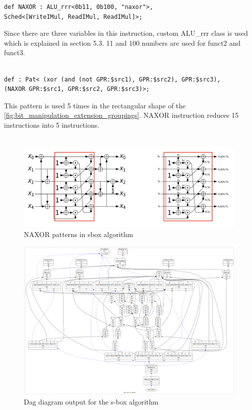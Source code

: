 \begin{lstlisting}
def NAXOR : ALU_rrr<0b11, 0b100, "naxor">,
Sched<[WriteIMul, ReadIMul, ReadIMul]>;
\end{lstlisting}

Since there are three variables in this instruction, custom ALU\_rrr class is used which is explained in section 5.3. 11 and 100 numbers are used for funct2 and funct3.
\\\\
\begin{lstlisting}
def : Pat< (xor (and (not GPR:$src1), GPR:$src2), GPR:$src3),
(NAXOR GPR:$src1, GPR:$src2, GPR:$src3)>;
\end{lstlisting}

This pattern is used 5 times in the rectangular shape of the \ref{fig:bit_manipulation_extension_groupings}. NAXOR instruction reduces 15 instructions into 5 instructions.
\\\\
\begin{figure}
    \centering
    \includegraphics[scale=0.3]{adding_new_instr/sbox_naxor_pattern.png}
    \caption{NAXOR patterns in sbox algorithm}
    \label{fig:sbox_naxor_pattern}
\end{figure}


\begin{figure}
    \centering
    \includegraphics[scale=0.35]{adding_new_instr/naxor_dag_diagram.png}
    \caption{Dag diagram output for the s-box algorithm}
    \label{fig:naxor_dag_diagram}
\end{figure}

